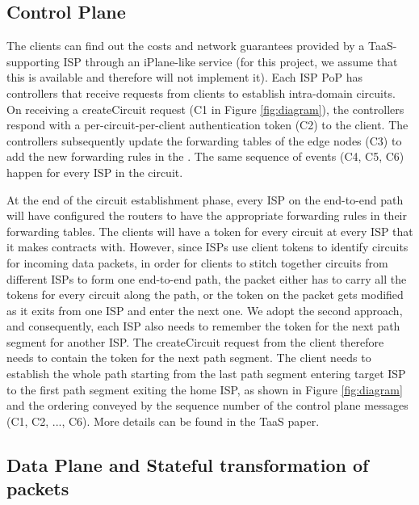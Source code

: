 \documentclass{article}
\begin{document}
\subsection{Control Plane}

The clients can find out the costs and network guarantees provided by
a TaaS-supporting ISP through an iPlane-like service (for this
project, we assume that this is available and therefore will not
implement it). Each ISP PoP has controllers that receive requests from
clients to establish intra-domain circuits. On receiving a
createCircuit request (C1 in Figure \ref{fig:diagram}), the
controllers respond with a per-circuit-per-client authentication token
(C2) to the client. The controllers subsequently update the forwarding
tables of the edge nodes (C3) to add the new forwarding rules in the .
The same sequence of events (C4, C5, C6) happen for every ISP in the
circuit.

At the end of the circuit establishment phase, every ISP on the
end-to-end path will have configured the routers to have the
appropriate forwarding rules in their forwarding tables. The clients
will have a token for every circuit at every ISP that it makes
contracts with. However, since ISPs use client tokens to identify
circuits for incoming data packets, in order for clients to stitch
together circuits from different ISPs to form one end-to-end path, the
packet either has to carry all the tokens for every circuit along the
path, or the token on the packet gets modified as it exits from one
ISP and enter the next one. We adopt the second approach, and
consequently, each ISP also needs to remember the token for the next
path segment for another ISP. The createCircuit request from the
client therefore needs to contain the token for the next path
segment. The client needs to establish the whole path starting from
the last path segment entering target ISP to the first path segment
exiting the home ISP, as shown in Figure \ref{fig:diagram} and the
ordering conveyed by the sequence number of the control plane messages
(C1, C2, ..., C6). More details can be found in the TaaS paper.

\subsection{Data Plane and Stateful transformation of packets}
\end{document}
